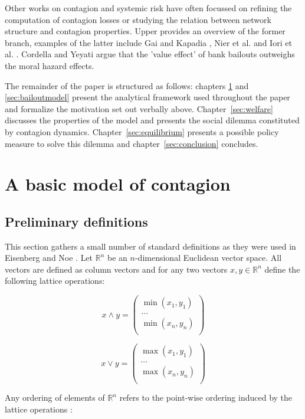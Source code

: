 \documentclass[12pt,a4paper]{article}
\begin{document}
Other works on contagion and systemic risk have often focussed on refining the computation of contagion losses or studying the relation between network structure and contagion properties. Upper \cite{Upper2011} provides an overview of the former branch, examples of the latter include Gai and Kapadia \cite{Gai2010}, Nier et al. \cite{Nier2008} and Iori et al. \cite{Iori2006}. Cordella and Yeyati \cite{Cordella2003} argue that the 'value effect' of bank bailouts outweighs the moral hazard effects.

The remainder of the paper is structured as follows: chapters \ref{sec:basicmodel} and \ref{sec:bailoutmodel} present the analytical framework used throughout the paper and formalize the motivation set out verbally above. Chapter~\ref{sec:welfare} discusses the properties of the model and presents the social dilemma constituted by contagion dynamics. Chapter~\ref{sec:equilibrium} presents a possible policy measure to solve this dilemma and chapter~\ref{sec:conclusion} concludes.

\section{A basic model of contagion} 
\label{sec:basicmodel}
\subsection{Preliminary definitions}

This section gathers a small number of standard definitions as they were used in Eisenberg and Noe \cite{Eisenberg2001}. Let $\mathbb{R}^n$ be an $n$-dimensional Euclidean vector space. All vectors are defined as column vectors and for any two vectors $x,y \in \mathbb{R}^n$ define the following lattice operations:

\[
x \wedge y = 
\begin{pmatrix}
\min (x_1, y_1)\\
\dots\\
\min (x_n, y_n)\\
\end{pmatrix}
\]

\[
x \vee y = 
\begin{pmatrix}
\max (x_1, y_1)\\
\dots\\
\max (x_n, y_n)\\
\end{pmatrix}
\]

Any ordering of elements of $\mathbb{R}^n$ refers to the point-wise ordering induced by the lattice operations \cite{Eisenberg2001}:
\end{document}
